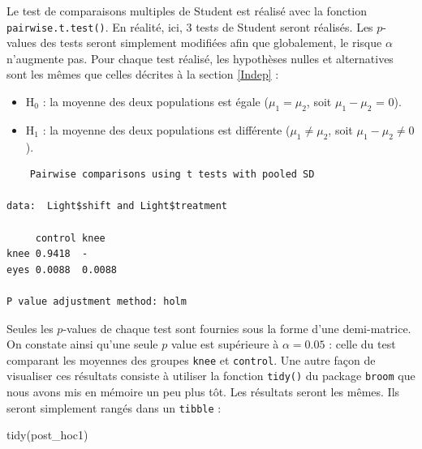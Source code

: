 \documentclass[
  a4paper,
]{article}
\newenvironment{Shaded}{\begin{snugshade}}{\end{snugshade}}
\newcommand{\CommentTok}[1]{\textcolor[rgb]{0.54,0.53,0.53}{#1}}
\newcommand{\FunctionTok}[1]{\textcolor[rgb]{0.39,0.29,0.61}{#1}}
\newcommand{\NormalTok}[1]{\textcolor[rgb]{0.12,0.11,0.11}{#1}}
\newcommand{\OtherTok}[1]{\textcolor[rgb]{0.00,0.43,0.16}{#1}}
\newcommand{\SpecialCharTok}[1]{\textcolor[rgb]{0.24,0.68,0.91}{#1}}
\providecommand{\tightlist}{%
  \setlength{\itemsep}{0pt}\setlength{\parskip}{0pt}}
\begin{document}
Le test de comparaisons multiples de Student est réalisé avec la fonction \texttt{pairwise.t.test()}. En réalité, ici, 3 tests de Student seront réalisés. Les \(p\)-values des tests seront simplement modifiées afin que globalement, le risque \(\alpha\) n'augmente pas. Pour chaque test réalisé, les hypothèses nulles et alternatives sont les mêmes que celles décrites à la section \ref{Indep} :

\begin{itemize}
\tightlist
\item
  H\(_0\) : la moyenne des deux populations est égale (\(\mu_1 = \mu_2\), soit \(\mu_1 - \mu_2\) = 0).
\item
  H\(_1\) : la moyenne des deux populations est différente (\(\mu_1 \neq \mu_2\), soit \(\mu_1 - \mu_2 \neq 0\)).
\end{itemize}

\begin{Shaded}
\end{Shaded}

\begin{verbatim}
    Pairwise comparisons using t tests with pooled SD 

data:  Light$shift and Light$treatment 

     control knee  
knee 0.9418  -     
eyes 0.0088  0.0088

P value adjustment method: holm 
\end{verbatim}

Seules les \(p\)-values de chaque test sont fournies sous la forme d'une demi-matrice. On constate ainsi qu'une seule \(p\) value est supérieure à \(\alpha = 0.05\) : celle du test comparant les moyennes des groupes \texttt{knee} et \texttt{control}. Une autre façon de visualiser ces résultats consiste à utiliser la fonction \texttt{tidy()} du package \texttt{broom} que nous avons mis en mémoire un peu plus tôt. Les résultats seront les mêmes. Ils seront simplement rangés dans un \texttt{tibble} :

\begin{Shaded}
\begin{Highlighting}[]
\FunctionTok{tidy}\NormalTok{(post\_hoc1)}
\end{Highlighting}
\end{Shaded}
\end{document}
